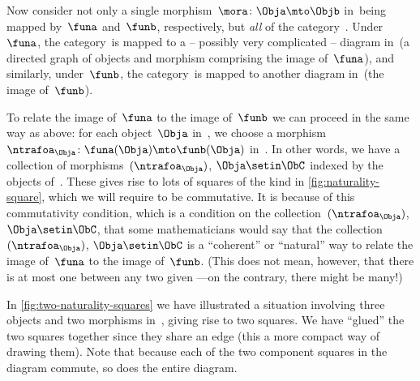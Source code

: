 Now consider not only a single morphism~$\mora \colon \Obja \mto \Objb$ in~\CatC being mapped by~$\funa$ and~$\funb$, respectively, but \emph{all} of the category~\CatC.
Under~$\funa$, the category~\CatC is mapped to a -- possibly very complicated -- diagram in~\CatD (a directed graph of objects and morphism comprising the image of~$\funa$), and similarly, under~$\funb$, the category~\CatC is mapped to another diagram in~\CatD (the image of~$\funb$).

To relate the image of~$\funa$ to the image of~$\funb$ we can proceed in the same way as above: for each object~$\Obja$ in~\CatC, we choose a morphism~$\ntrafoa_\Obja \colon \funa(\Obja) \mto \funb(\Obja)$ in~\CatD.
In other words, we have a collection of morphisms~$(\ntrafoa_\Obja)$, ${\Obja \setin \ObC}$ indexed by the objects of~\CatC.
These gives rise to lots of squares of the kind in \cref{fig:naturality-square}, which we will require to be commutative.
It is because of this commutativity condition, which is a condition on the collection~$(\ntrafoa_\Obja)$, ${\Obja \setin \ObC}$, that some mathematicians would say that the collection~$(\ntrafoa_\Obja)$, ${\Obja \setin \ObC}$ is a ``coherent'' or ``natural'' way to relate the image of~$\funa$ to the image of~$\funb$.
(This does not mean, however, that there is at most one  between any two given ---on the contrary, there might be many!)

\begin{marginfigure}
    \centering
    \caption{}
    \label{fig:two-naturality-squares}
\end{marginfigure}

In \cref{fig:two-naturality-squares} we have illustrated a situation involving three objects and two morphisms in~\CatC, giving rise to two squares.
We have ``glued'' the two squares together since they share an edge (this a more compact way of drawing them).
Note that because each of the two component squares in the diagram commute, so does the entire diagram.


